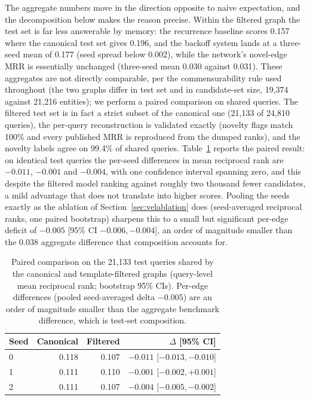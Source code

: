\documentclass[a4paper,12pt]{report}
\begin{document}
The aggregate numbers move in the direction opposite to naive
expectation, and the decomposition below makes the reason precise. Within the filtered graph the test set is far less answerable by
memory: the recurrence baseline scores 0.157 where the canonical test
set gives 0.196, and the backoff system lands at a three-seed mean of
0.177 (seed spread below 0.002), while the network's novel-edge MRR is
essentially unchanged (three-seed mean 0.030 against 0.031). These
aggregates are not directly comparable, per the commensurability rule
used throughout (the two graphs differ in test set and in candidate-set
size, 19{,}374 against 21{,}216 entities); we perform a
paired comparison on shared queries. The filtered test set is in fact a
strict subset of the canonical one (21{,}133 of 24{,}810 queries), the
per-query reconstruction is validated exactly (novelty flags match
100\% and every published MRR is reproduced from the dumped ranks), and
the novelty labels agree on 99.4\% of shared queries.
Table~\ref{tab:tfshared} reports the paired result: on identical test
queries the per-seed differences in mean reciprocal rank are $-0.011$,
$-0.001$ and $-0.004$, with one confidence interval spanning zero, and
this despite the filtered model ranking against roughly two thousand
fewer candidates, a mild advantage that does not translate into higher
scores. Pooling the
seeds exactly as the ablation of Section~\ref{sec:velablation} does
(seed-averaged reciprocal ranks, one paired bootstrap) sharpens this to
a small but significant per-edge deficit of $-0.005$ [95\% CI $-0.006,
-0.004$], an order of magnitude smaller than the $0.038$ aggregate
difference that composition accounts for.

\begin{table}[ht]
\centering
\caption{Paired comparison on the 21{,}133 test queries shared by the
canonical and template-filtered graphs (query-level mean reciprocal
rank; bootstrap 95\% CIs). Per-edge differences (pooled seed-averaged
delta $-0.005$) are an order of magnitude smaller than the aggregate
benchmark difference, which is test-set composition.}
\label{tab:tfshared}
\begin{tabular}{lrrr}
\toprule
Seed & Canonical & Filtered & $\Delta$ [95\% CI] \\
\midrule
0 & 0.118 & 0.107 & $-0.011$ [$-0.013,-0.010$] \\
1 & 0.111 & 0.110 & $-0.001$ [$-0.002,+0.001$] \\
2 & 0.111 & 0.107 & $-0.004$ [$-0.005,-0.002$] \\
\bottomrule
\end{tabular}
\end{table}
\end{document}
